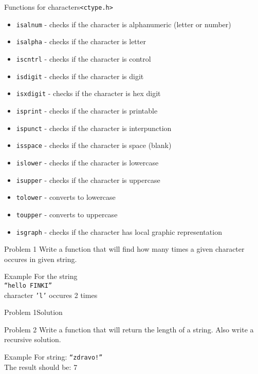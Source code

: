 \begin{frame}[shrink=10]{Functions for characters}{\texttt{<ctype.h>}}
\begin{itemize}
  \item \texttt{isalnum} - checks if the character is alphanumeric (letter or
  number)
  \item \texttt{isalpha} - checks if the character is letter
  \item \texttt{iscntrl} - checks if the character is control
  \item \texttt{isdigit} - checks if the character is digit
  \item \texttt{isxdigit} - checks if the character is hex digit
  \item \texttt{isprint} - checks if the character is printable
  \item \texttt{ispunct} - checks if the character is interpunction
  \item \texttt{isspace} - checks if the character is space (blank)
  \item \texttt{islower} - checks if the character is lowercase
  \item \texttt{isupper} - checks if the character is uppercase
  \item \texttt{tolower} - converts to lowercase
  \item \texttt{toupper}  - converts to uppercase
  \item \texttt{isgraph} - checks if the character has local graphic
  representation
\end{itemize}
\end{frame}




\begin{frame}{Problem 1}
Write a function that will find how many times a given character occures in
given string.
\begin{exampleblock}{Example}
For the string\\
\texttt{``hello FINKI''}\\
character \texttt{'l'} occures 2 times
\end{exampleblock}
\end{frame}

\begin{frame}[fragile]{Problem 1}{Solution}

\end{frame}

\begin{frame}{Problem 2}
Write a function that will return the length of a string. Also write a recursive
solution.
\begin{exampleblock}{Example} 
For string: \texttt{``zdravo!''}\\
The result should be: 7
\end{exampleblock}
\end{frame}

